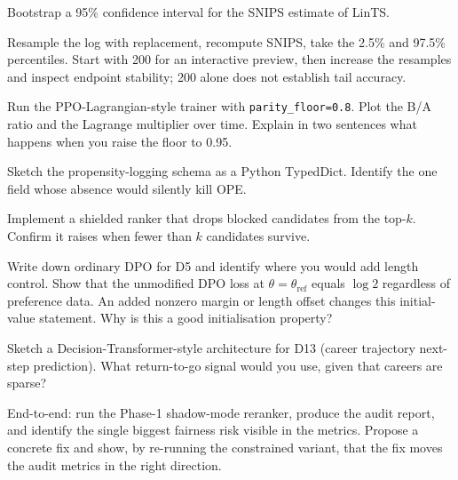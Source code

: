 \documentclass[11pt,oneside]{scrbook}
\begin{document}
\begin{exercise}[$\star$$\star$]
Bootstrap a 95\% confidence interval for the SNIPS estimate of LinTS.
\begin{intuition}
Resample the log with replacement, recompute SNIPS, take the 2.5\% and
97.5\% percentiles. Start with 200 for an interactive preview, then increase the resamples and inspect endpoint stability; 200 alone does not establish tail accuracy.
\end{intuition}
\end{exercise}

\begin{exercise}[$\star$$\star$]
Run the PPO-Lagrangian-style trainer with \texttt{parity\_floor=0.8}.
Plot the B/A ratio and the Lagrange multiplier over time. Explain in
two sentences what happens when you raise the floor to 0.95.
\end{exercise}

\begin{exercise}[$\star$$\star$]
Sketch the propensity-logging schema as a Python TypedDict. Identify the
one field whose absence would silently kill OPE.
\end{exercise}

\begin{exercise}[$\star$$\star$]
Implement a shielded ranker that drops blocked candidates from the
top-$k$. Confirm it raises when fewer than $k$ candidates survive.
\end{exercise}

\begin{exercise}[$\star$$\star$$\star$]
Write down ordinary DPO for D5 and identify where you would add length control. Show that the unmodified DPO loss at $\theta = \theta_{\text{ref}}$ equals $\log 2$ regardless of preference data. An added nonzero margin or length offset changes this initial-value statement. Why is this a good initialisation property?
\end{exercise}

\begin{exercise}[$\star$$\star$$\star$]
Sketch a Decision-Transformer-style architecture for D13 (career
trajectory next-step prediction). What return-to-go signal would you
use, given that careers are sparse?
\end{exercise}

\begin{exercise}
End-to-end: run the Phase-1 shadow-mode reranker, produce the audit
report, and identify the single biggest fairness risk visible in the
metrics. Propose a concrete fix and show, by re-running the constrained
variant, that the fix moves the audit metrics in the right direction.
\end{exercise}
\end{document}
